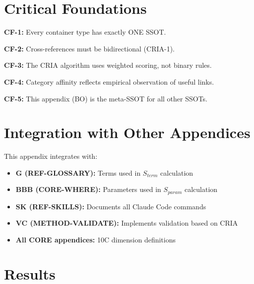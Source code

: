 \section{Critical Foundations}
\label{sec:bo-critical}

\begin{tcolorbox}[colback=red!5!white, colframe=red!75!black,
    title=Critical Foundations]

\textbf{CF-1:} Every container type has exactly ONE SSOT.

\textbf{CF-2:} Cross-references must be bidirectional (CRIA-1).

\textbf{CF-3:} The CRIA algorithm uses weighted scoring, not binary rules.

\textbf{CF-4:} Category affinity reflects empirical observation of useful links.

\textbf{CF-5:} This appendix (BO) is the meta-SSOT for all other SSOTs.

\end{tcolorbox}


\section{Integration with Other Appendices}
\label{sec:bo-integration}

This appendix integrates with:

\begin{itemize}
\item \textbf{G (REF-GLOSSARY):} Terms used in $S_{term}$ calculation
\item \textbf{BBB (CORE-WHERE):} Parameters used in $S_{param}$ calculation
\item \textbf{SK (REF-SKILLS):} Documents all Claude Code commands
\item \textbf{VC (METHOD-VALIDATE):} Implements validation based on CRIA
\item \textbf{All CORE appendices:} 10C dimension definitions
\end{itemize}


\section{Results}
\label{sec:bo-results}

